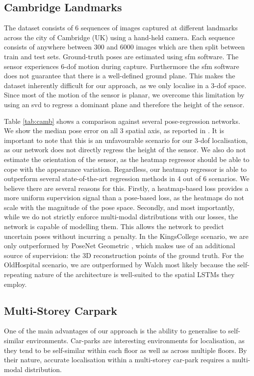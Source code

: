 \documentclass[letterpaper, 10 pt, conference]{ieeeconf}  %
\begin{document}
\subsection{Cambridge Landmarks}

The dataset consists of 6 sequences of images captured at different landmarks across the city of Cambridge (UK) using a hand-held camera.
Each sequence consists of anywhere between \ensuremath{300} and \ensuremath{6000} images which are then split between train and test sets.
Ground-truth poses are estimated using \ac{sfm} \cite{Changchang2013} software.
The sensor experiences 6-\ac{dof} motion during capture. 
Furthermore the \ac{sfm} software does not guarantee that there is a well-defined ground plane.
This makes the dataset inherently difficult for our approach, as we only localise in a 3-\ac{dof} space.
Since most of the motion of the sensor is planar, we overcome this limitation by using an \ac{svd} to regress a dominant plane and therefore the height of the sensor.

Table \ref{tab:camb} shows a comparison against several pose-regression networks. 
We show the median pose error on all 3 spatial axis, as reported in \cite{kendall2017geometric}.
It is important to note that this is an unfavourable scenario for our 3-\ac{dof} localisation, as our network does not directly regress the height of the sensor.
We also do not estimate the orientation of the sensor, as the heatmap regressor should be able to cope with the appearance variation.
Regardless, our heatmap regressor is able to outperform several state-of-the-art regression methods in 4 out of 6 scenarios.
We believe there are several reasons for this.
Firstly, a heatmap-based loss provides a more uniform supervision signal than a pose-based loss, as the heatmaps do not scale with the magnitude of the pose space.
Secondly, and most importantly, while we do not strictly enforce multi-modal distributions with our losses, the network is capable of modelling them.
This allows the network to predict uncertain poses without incurring a penalty.
In the KingsCollege scenario, we are only outperformed by PoseNet Geometric \cite{kendall2017geometric}, which makes use of an additional source of supervision: the 3D reconstruction points of the ground truth.
For the OldHospital scenario, we are outperformed by Walch \etal \cite{Walch17} most likely because the self-repeating nature of the architecture is well-suited to the spatial LSTMs they employ.
\vspace{-0.125cm}
\subsection{Multi-Storey Carpark}
One of the main advantages of our approach is the ability to generalise to self-similar environments.
Car-parks are interesting environments for localisation, as they tend to be self-similar within each floor as well as across multiple floors.
By their nature, accurate localisation within a multi-storey car-park requires a multi-modal distribution.
\end{document}
